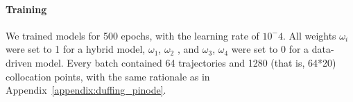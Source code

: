 \paragraph{Training} We trained models for 500 epochs, with the learning rate of $10^-4$. All weights $\omega_i$ were set to 1 for a hybrid model, $\omega_1$, $\omega_2$ , and $\omega_3$, $\omega_4$ were set to 0 for a data-driven model. Every batch contained 64 trajectories and 1280 (that is, 64*20) collocation points, with the same rationale as in Appendix~\ref{appendix:duffing_pinode}.

